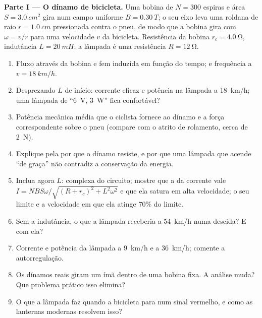 \begin{problem}
\medskip
\noindent\textbf{Parte I --- O dínamo de bicicleta.}
Uma bobina de $N = 300$ espiras e área $S = \qty{3.0}{cm^2}$ gira num
campo uniforme $B = \qty{0.30}{T}$; o seu eixo leva uma roldana de raio
$r = \qty{1.0}{cm}$ pressionada contra o pneu, de modo que a bobina gira com
$\omega = v/r$ para uma velocidade $v$ da bicicleta. Resistência da bobina $r_c = \qty{4.0}{\ohm}$,
indutância $L = \qty{20}{mH}$; a lâmpada é uma resistência $R = \qty{12}{\ohm}$.
\begin{enumerate}
  \item Fluxo através da bobina e fem induzida em função do tempo;
         e frequência a $v = \qty{18}{km/h}$.
  \item Desprezando $L$ de início: corrente eficaz e potência na lâmpada a
        \qty{18}{km/h}; uma lâmpada de ``\qty{6}{V}, \qty{3}{W}'' fica confortável?
  \item Potência mecânica média que o ciclista fornece ao dínamo e a
        força correspondente sobre o pneu (compare com o atrito de
        rolamento, cerca de \qty{2}{N}).
  \item Explique pela  por que o dínamo resiste, e por que uma lâmpada
        que acende ``de graça'' não contradiz a conservação da energia.
  \item Inclua agora $L$:  complexa do circuito; mostre que
        a  da corrente vale $I = NBS\omega/\sqrt{(R + r_c)^2 + L^2\omega^2}$
        e que ela satura em alta velocidade; o seu limite e a
        velocidade em que ela atinge $70\%$ do limite.
  \item Sem a indutância, o que a lâmpada receberia a
        \qty{54}{km/h} numa descida? E com ela?
  \item Corrente e potência da lâmpada a \qty{9}{km/h} e a \qty{36}{km/h}; comente
        a autorregulação.
  \item Os dínamos reais giram um ímã dentro de uma bobina fixa. A
        análise muda? Que problema prático isso elimina?
  \item O que a lâmpada faz quando a bicicleta para num sinal vermelho,
        e como as lanternas modernas resolvem isso?
\end{enumerate}


\end{problem}
